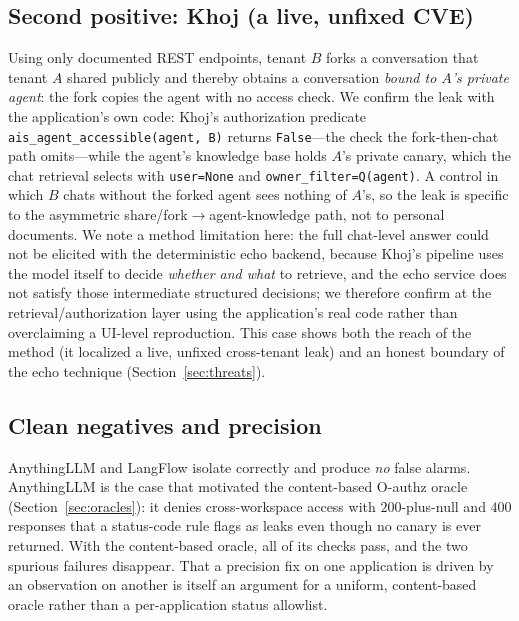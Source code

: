 \IfFileExists{IEEEtran.cls}{\documentclass[conference]{IEEEtran}}{\documentclass[10pt,twocolumn]{article}}
\newcommand{\code}[1]{\texttt{\small #1}}
\begin{document}
\subsection{Second positive: Khoj (a live, unfixed CVE)}
Using only documented REST endpoints, tenant $B$ forks a conversation that tenant $A$ shared
publicly and thereby obtains a conversation \emph{bound to $A$'s private agent}: the fork copies the
agent with no access check. We confirm the leak with the application's own code: Khoj's
authorization predicate \code{ais\_agent\_accessible(agent, B)} returns \code{False}---the check the
fork-then-chat path omits---while the agent's knowledge base holds $A$'s private canary, which the
chat retrieval selects with \code{user=None} and \code{owner\_filter=Q(agent)}. A control in which
$B$ chats without the forked agent sees nothing of $A$'s, so the leak is specific to the asymmetric
share/fork$\rightarrow$agent-knowledge path, not to personal documents. We note a method limitation
here: the full chat-level answer could not be elicited with the deterministic echo backend, because
Khoj's pipeline uses the model itself to decide \emph{whether and what} to retrieve, and the echo
service does not satisfy those intermediate structured decisions; we therefore confirm at the
retrieval/authorization layer using the application's real code rather than overclaiming a UI-level
reproduction. This case shows both the reach of the method (it localized a live, unfixed
cross-tenant leak) and an honest boundary of the echo technique (Section~\ref{sec:threats}).

\subsection{Clean negatives and precision}
AnythingLLM and LangFlow isolate correctly and produce \emph{no} false alarms. AnythingLLM is the
case that motivated the content-based O-authz oracle (Section~\ref{sec:oracles}): it denies
cross-workspace access with $200$-plus-null and $400$ responses that a status-code rule flags as
leaks even though no canary is ever returned. With the content-based oracle, all of its checks pass,
and the two spurious failures disappear. That a precision fix on one application is driven by an
observation on another is itself an argument for a uniform, content-based oracle rather than a
per-application status allowlist.
\end{document}
